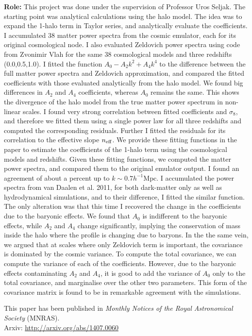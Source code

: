 {\bf Role:} This project was done under the supervision of Professor Uros Seljak. 
The starting point was analytical calculations using the halo model. The
idea was to expand the 1-halo term in Taylor series, and analytically
evaluate the coefficients. I accumulated 38 matter power spectra
from the cosmic emulator, each for its original cosmological node. I
also evaluated Zeldovich power spectra using code from Zvonimir Vlah
for the same 38 cosmological models and three redshifts (0.0,0.5,1.0).
I fitted the function $A_0 - A_2k^2 + A_4k^4$ to the difference between 
the full matter power spectra and Zeldovich
approximation, and compared
the fitted coefficients with those evaluated analytically from the halo model. 
We found big differences in $A_2$ and $A_4$ coefficients, whereas
$A_0$ remains the same. This shows the divergence of the halo model
from the true matter power spectrum in non-linear scales. 
I found very strong correlation between fitted coefficients and $\sigma_8$,
and therefore we fitted them using a single power law for all three redshifts
and computed the corresponding residuals. 
Further I fitted the residuals for its correlation to the 
effective slope $n_{\rm eff}$.
We provide these fitting functions in the paper to estimate the 
coefficients of the 1-halo term using the cosmological models
and redshifts. Given these fitting functions, we computed the matter
power spectra, and compared them to the original emulator output. 
I found an agreement of about a percent up to $k\sim 0.7 h^{-1}\mathrm{Mpc}$.
I accumulated the power spectra from van Daalen et al. 2011, for both
dark-matter only as well as hydrodynamical simulations, 
and to their difference, I fitted the similar function. 
The only alteration was that this time I 
recovered the change in the coefficients due to the baryonic effects. 
We found that $A_0$ is indifferent to the baryonic effects, while
$A_2$ and $A_4$ change significantly, implying the conservation of
mass inside the halo where the profile is changing due to baryons. 
In the the same vein, we argued that at scales where only Zeldovich
term is important, the covariance is dominated by the cosmic variance.
To compute the total covariance, we can compute the variance of 
each of the coefficients. However, due to the baryonic effects contaminating
$A_2$ and $A_4$, it is good to add the variance of $A_0$ only to the
total covariance, and marginalise over the other two parameters. 
This form of the covariance matrix is found to be in remarkable
agreement with the simulations. 

This paper has been published in {\it Monthly Notices of the Royal Astronomical
Society} (MNRAS). 
\\
Arxiv: \url{http://arxiv.org/abs/1407.0060}
\clearpage
